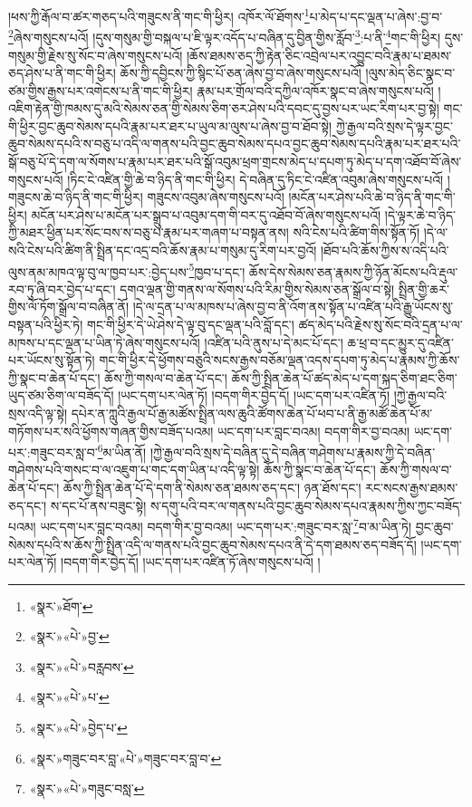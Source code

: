 །ཕས་ཀྱི་རྒོལ་བ་ཚར་གཅད་པའི་གཟུངས་ནི་གང་གི་ཕྱིར། འཁོར་ལོ་ཐོགས་\footnote{«སྣར་»ཐོག་}པ་མེད་པ་དང་ལྡན་པ་ཞེས་:བྱ་བ་\footnote{«སྣར་»«པེ་»བྱ་}ཞེས་གསུངས་པའོ། །དུས་གསུམ་གྱི་བསྐལ་པ་ཇི་ལྟར་འདོད་པ་བཞིན་དུ་བྱིན་གྱིས་རློབ་\footnote{«སྣར་»«པེ་»བརླབས་}:པ་ནི་\footnote{«སྣར་»«པེ་»པ་}གང་གི་ཕྱིར། དུས་གསུམ་གྱི་རྗེས་སུ་སོང་བ་ཞེས་གསུངས་པའོ། །ཆོས་ཐམས་ཅད་ཀྱི་རྟེན་ཅིང་འབྲེལ་པར་འབྱུང་བའི་རྣམ་པ་ཐམས་ཅད་ཤེས་པ་ནི་གང་གི་ཕྱིར། ཆོས་ཀྱི་དབྱིངས་ཀྱི་སྙིང་པོ་ཅན་ཞེས་བྱ་བ་ཞེས་གསུངས་པའོ། །ལུས་མེད་ཅིང་སྣང་བ་ཙམ་གྱིས་རྒྱས་པར་འགེངས་པ་ནི་གང་གི་ཕྱིར། རྣམ་པར་གྲོལ་བའི་དཀྱིལ་འཁོར་སྣང་བ་ཞེས་གསུངས་པའོ། །འཇིག་རྟེན་གྱི་ཁམས་དུ་མའི་སེམས་ཅན་གྱི་སེམས་ཅིག་ཅར་ཤེས་པའི་དབང་དུ་བྱས་པར་ཡང་རིག་པར་བྱ་སྟེ། གང་གི་ཕྱིར་བྱང་ཆུབ་སེམས་དཔའི་རྣམ་པར་ཐར་པ་ཡུལ་མ་ལུས་པ་ཞེས་བྱ་བ་ཐོབ་སྟེ། ཀྱེ་རྒྱལ་བའི་སྲས་དེ་ལྟར་བྱང་ཆུབ་སེམས་དཔའི་ས་བཅུ་པ་འདི་ལ་གནས་པའི་བྱང་ཆུབ་སེམས་དཔའ་བྱང་ཆུབ་སེམས་དཔའི་རྣམ་པར་ཐར་པའི་སྒོ་བཅུ་པོ་དེ་དག་ལ་སོགས་པ་རྣམ་པར་ཐར་པའི་སྒོ་འབུམ་ཕྲག་གྲངས་མེད་པ་དཔག་ཏུ་མེད་པ་དག་འཐོབ་བོ་ཞེས་གསུངས་པའོ། །ཏིང་ངེ་འཛིན་གྱི་ཆེ་བ་ཉིད་ནི་གང་གི་ཕྱིར། དེ་བཞིན་དུ་ཏིང་ངེ་འཛིན་འབུམ་ཞེས་གསུངས་པའོ། །གཟུངས་ཆེ་བ་ཉིད་ནི་གང་གི་ཕྱིར། གཟུངས་འབུམ་ཞེས་གསུངས་པའོ། །མངོན་པར་ཤེས་པའི་ཆེ་བ་ཉིད་ནི་གང་གི་ཕྱིར། མངོན་པར་ཤེས་པ་མངོན་པར་སྒྲུབ་པ་འབུམ་དག་གི་བར་དུ་འཐོབ་བོ་ཞེས་གསུངས་པའོ། །དེ་ལྟར་ཆེ་བ་ཉིད་ཀྱི་མཐར་ཕྱིན་པར་སོང་བས་ས་བཅུ་པ་རྣམ་པར་གཞག་པ་བསྟན་ནས། སའི་ངེས་པའི་ཚིག་གིས་སྟོན་ཏོ། །དེ་ལ་སའི་ངེས་པའི་ཚིག་ནི་སྤྲིན་དང་འདྲ་བའི་ཆོས་རྣམ་པ་གསུམ་དུ་རིག་པར་བྱའོ། །ཐོབ་པའི་ཆོས་ཀྱིས་ས་འདི་པའི་ལུས་ནམ་མཁའ་ལྟ་བུ་ལ་ཁྱབ་པར་:བྱེད་པས་\footnote{«སྣར་»«པེ་»བྱེད་པ་}ཁྱབ་པ་དང་། ཆོས་དེས་སེམས་ཅན་རྣམས་ཀྱི་ཉོན་མོངས་པའི་རྡུལ་རབ་ཏུ་ཞི་བར་བྱེད་པ་དང་། དགའ་ལྡན་གྱི་གནས་ལ་སོགས་པའི་རིམ་གྱིས་སེམས་ཅན་སྒྲོལ་བ་སྟེ། སྤྲིན་གྱི་ཆར་གྱིས་ལོ་ཏོག་སྒྲོལ་བ་བཞིན་ནོ། །དེ་ལ་དྲན་པ་ལ་མཁས་པ་ཞེས་བྱ་བ་ནི་འོག་ནས་སྟོན་པ་འཛིན་པའི་རྒྱུ་ཡོངས་སུ་བསྟན་པའི་ཕྱིར་ཏེ། གང་གི་ཕྱིར་དེ་ཡེ་ཤེས་དེ་ལྟ་བུ་དང་ལྡན་པའི་བློ་དང་། ཚད་མེད་པའི་རྗེས་སུ་སོང་བའི་དྲན་པ་ལ་མཁས་པ་དང་ལྡན་པ་ཡིན་ཏེ་ཞེས་གསུངས་པའོ། །འཛིན་པའི་ནུས་པ་དེ་མང་པོ་དང་། ཆ་ཕྲ་བ་དང་མྱུར་དུ་འཛིན་པར་ཡོངས་སུ་སྟོན་ཏེ། གང་གི་ཕྱིར་དེ་ཕྱོགས་བཅུའི་སངས་རྒྱས་བཅོམ་ལྡན་འདས་དཔག་ཏུ་མེད་པ་རྣམས་ཀྱི་ཆོས་ཀྱི་སྣང་བ་ཆེན་པོ་དང་། ཆོས་ཀྱི་གསལ་བ་ཆེན་པོ་དང་། ཆོས་ཀྱི་སྤྲིན་ཆེན་པོ་ཚད་མེད་པ་དག་སྐད་ཅིག་ཐང་ཅིག་ཡུད་ཙམ་ཅིག་ལ་བཟོད་དོ། །ཡང་དག་པར་ལེན་ཏོ། །བདག་གིར་བྱེད་དོ། །ཡང་དག་པར་འཛིན་ཏོ། །ཀྱེ་རྒྱལ་བའི་སྲས་འདི་ལྟ་སྟེ། དཔེར་ན་ཀླུའི་རྒྱལ་པོ་རྒྱ་མཚོས་སྤྲིན་ལས་ཆུའི་ཚོགས་ཆེན་པོ་ཕབ་པ་ནི་རྒྱ་མཚོ་ཆེན་པོ་མ་གཏོགས་པར་སའི་ཕྱོགས་གཞན་གྱིས་བཟོད་པའམ། ཡང་དག་པར་བླང་བའམ། བདག་གིར་བྱ་བའམ། ཡང་དག་པར་:གཟུང་བར་སླ་བ་\footnote{«སྣར་»གཟུང་བར་བླ་«པེ་»གཟུང་བར་བླ་བ་}མ་ཡིན་ནོ། །ཀྱེ་རྒྱལ་བའི་སྲས་དེ་བཞིན་དུ་དེ་བཞིན་གཤེགས་པ་རྣམས་ཀྱི་དེ་བཞིན་གཤེགས་པའི་གསང་བ་ལ་འཇུག་པ་གང་དག་ཡིན་པ་འདི་ལྟ་སྟེ། ཆོས་ཀྱི་སྣང་བ་ཆེན་པོ་དང་། ཆོས་ཀྱི་གསལ་བ་ཆེན་པོ་དང་། ཆོས་ཀྱི་སྤྲིན་ཆེན་པོ་དེ་དག་ནི་སེམས་ཅན་ཐམས་ཅད་དང་། ཉན་ཐོས་དང་། རང་སངས་རྒྱས་ཐམས་ཅད་དང་། ས་དང་པོ་ནས་བཟུང་སྟེ། ས་དགུ་པའི་བར་ལ་གནས་པའི་བྱང་ཆུབ་སེམས་དཔའ་རྣམས་ཀྱིས་ཀྱང་བཟོད་པའམ། ཡང་དག་པར་བླང་བའམ། བདག་གིར་བྱ་བའམ། ཡང་དག་པར་:གཟུང་བར་སླ་\footnote{«སྣར་»«པེ་»གཟུང་བསླ་}བ་མ་ཡིན་ཏེ། བྱང་ཆུབ་སེམས་དཔའི་ས་ཆོས་ཀྱི་སྤྲིན་འདི་ལ་གནས་པའི་བྱང་ཆུབ་སེམས་དཔའ་ནི་དེ་དག་ཐམས་ཅད་བཟོད་དོ། །ཡང་དག་པར་ལེན་ཏོ། །བདག་གིར་བྱེད་དོ། །ཡང་དག་པར་འཛིན་ཏོ་ཞེས་གསུངས་པའོ། །
